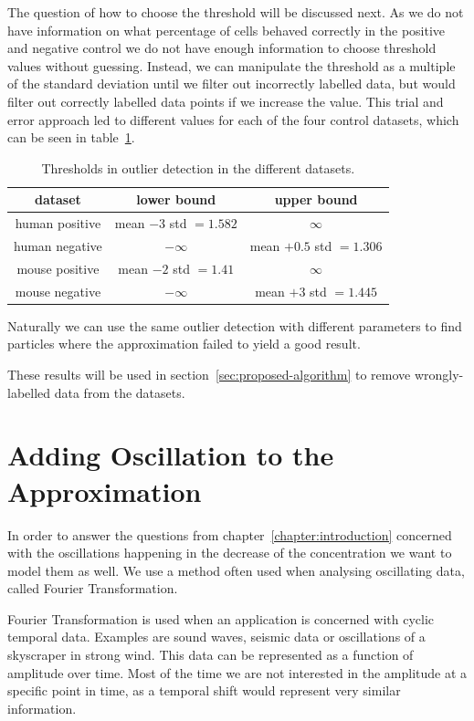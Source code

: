 The question of how to choose the threshold will be discussed next. As we do not have information on what percentage of cells behaved correctly in the positive and negative control we do not have enough information to choose threshold values without guessing. Instead, we can manipulate the threshold as a multiple of the standard deviation until we filter out incorrectly labelled data, but would filter out correctly labelled data points if we increase the value. This trial and error approach led to different values for each of the four control datasets, which can be seen in table~\ref{tab:threshold_outlier}.

\begin{table}[h!]
	\centering
	\begin{tabular}{|c|c|c|}
		\hline
		\textbf{dataset} & \textbf{lower bound} & \textbf{upper bound}\\
		\hline
		\hline
		human positive & mean $ - 3$ std $ = 1.582$ & $\infty$ \\
		\hline
		human negative & $-\infty$ & mean $ + 0.5$ std $ = 1.306$ \\
		\hline
		mouse positive & mean $ - 2$ std $ = 1.41$ & $\infty$ \\
		\hline
		mouse negative & $-\infty$ & mean $ + 3$ std $ = 1.445$ \\
		\hline
	\end{tabular}
	\caption{Thresholds in outlier detection in the different datasets.}
	\label{tab:threshold_outlier}
\end{table}

Naturally we can use the same outlier detection with different parameters to find particles where the approximation failed to yield a good result.

These results will be used in section~\ref{sec:proposed-algorithm} to remove wrongly-labelled data from the datasets.

\section{Adding Oscillation to the Approximation}
\label{sec:adding_oscillation_to_the_approximation}

In order to answer the questions from chapter~\ref{chapter:introduction} concerned with the oscillations  happening in the decrease of the \Calcium concentration we want to model them as well. We use a method often used when analysing oscillating data, called Fourier Transformation.

Fourier Transformation is used when an application is concerned with cyclic temporal data. Examples are sound waves, seismic data or oscillations of a skyscraper in strong wind. This data can be represented as a function of amplitude over time. Most of the time we are not interested in the amplitude at a specific point in time, as a temporal shift would represent very similar information.

